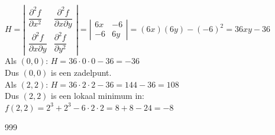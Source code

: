 \documentclass[a4paper]{article}
\begin{document}
$H = 
\left|
\begin{array}{ccc}
\dfrac{\partial^2 f}{\partial x^2} & \dfrac{\partial^2 f}{\partial x \partial y}\\
\dfrac{\partial^2 f}{\partial x \partial y} & \dfrac{\partial^2 f}{\partial y^2}
\end{array}
\right| = 
\left|
\begin{array}{ccc}
6x & -6\\
-6 & 6y
\end{array}
\right| = (6x)(6y)-(-6)^2=36xy-36
$\\




Als $(0,0)$: $H = 36\cdot 0 \cdot 0 -36 = -36$\\

Dus $(0, 0)$ is een zadelpunt.\\

Als $(2, 2)$: $H = 36 \cdot 2 \cdot 2 - 36 = 144 - 36 = 108$\\

Dus $(2, 2)$ is een lokaal minimum in:\\

$f(2, 2) = 2^3 + 2^3 -6 \cdot 2 \cdot 2 = 8+8-24=-8$\\
\begin{thebibliography}{999}
\end{thebibliography}
\end{document}
